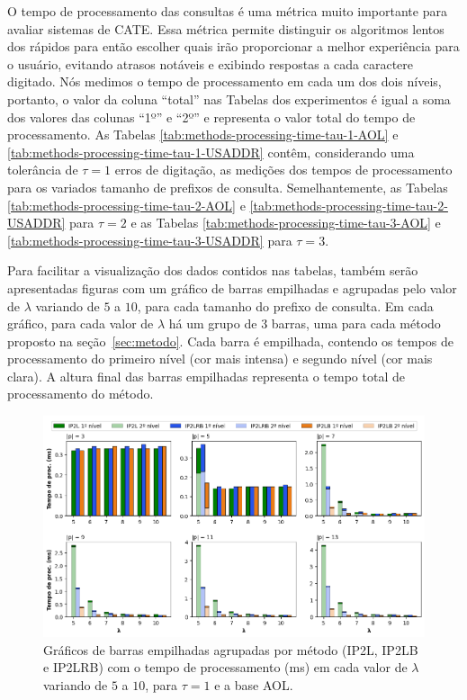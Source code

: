 O tempo de processamento das consultas é uma métrica muito importante para avaliar sistemas de CATE. Essa métrica permite distinguir os algoritmos lentos dos rápidos para então escolher quais irão proporcionar a melhor experiência para o usuário, evitando atrasos notáveis e exibindo respostas a cada caractere digitado. Nós medimos o tempo de processamento em cada um dos dois níveis, portanto, o valor da coluna ``total'' nas Tabelas dos experimentos é igual a soma dos valores das colunas ``1º'' e ``2º'' e representa o valor total do tempo de processamento. As Tabelas \ref{tab:methods-processing-time-tau-1-AOL} e  \ref{tab:methods-processing-time-tau-1-USADDR} contêm, considerando uma tolerância de $\tau=1$ erros de digitação, as medições dos tempos de processamento para os variados tamanho de prefixos de consulta. Semelhantemente, as Tabelas \ref{tab:methods-processing-time-tau-2-AOL} e \ref{tab:methods-processing-time-tau-2-USADDR} para $\tau=2$ e as Tabelas \ref{tab:methods-processing-time-tau-3-AOL} e \ref{tab:methods-processing-time-tau-3-USADDR} para $\tau=3$.

Para facilitar a visualização dos dados contidos nas tabelas, também serão apresentadas figuras com um gráfico de barras empilhadas e agrupadas pelo valor de $\lambda$ variando de $5$ a $10$, para cada tamanho do prefixo de consulta. Em cada gráfico, para cada valor de $\lambda$ há um grupo de $3$ barras, uma para cada método proposto na seção~\ref{sec:metodo}. Cada barra é empilhada, contendo os tempos de processamento do primeiro nível (cor mais intensa) e segundo nível (cor mais clara). A altura final das barras empilhadas representa o tempo total de processamento do método.

\begin{figure} [h]
    \centering
    \includegraphics[width=1.0\textwidth]{figures/methods_processing_time_aol_1.png}
    \caption{Gráficos de barras empilhadas agrupadas por método (IP2L, IP2LB e IP2LRB) com o tempo de processamento (ms) em cada valor de $\lambda$ variando de $5$ a $10$, para $\tau=1$ e a base AOL.}
    \label{fig:methods_processing_time_aol_1}
\end{figure}

